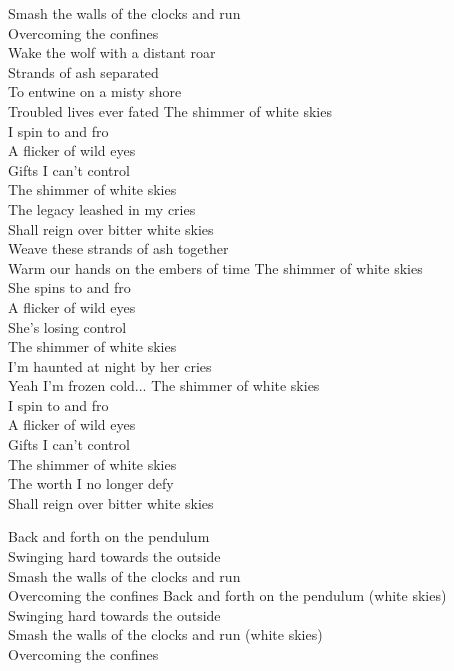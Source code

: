  Smash the walls of the clocks and run\\
 Overcoming the confines\\
 Wake the wolf with a distant roar\\
 Strands of ash separated\\
 To entwine on a misty shore\\
 Troubled lives ever fated
\hop
{} {} The shimmer of white skies\\
 {} I spin to and fro\\
 {} A flicker of wild eyes\\
 {} Gifts I can't control\\
 {} The shimmer of white skies\\
 {} The legacy leashed in my cries\\
 {} Shall reign over bitter white skies\\
\hops
Weave these strands of ash together\\
Warm our hands on the embers of time
\hops
{} {} The shimmer of white skies\\
 {} She spins to and fro\\
 {} A flicker of wild eyes\\
 {} She's losing control\\
 {} The shimmer of white skies\\
 {} I'm haunted at night by her cries\\
 {} Yeah I'm frozen cold...
\hops
{} {} The shimmer of white skies\\
 {} I spin to and fro\\
 {} A flicker of wild eyes\\
 {} Gifts I can't control\\
 {} The shimmer of white skies\\
 {} The worth I no longer defy\\
 {} Shall reign over bitter white skies

 Back and forth on the pendulum\\
 Swinging hard towards the outside\\
 Smash the walls of the clocks and run\\
 Overcoming the confines\hop
{} Back and forth on the pendulum (white skies)\\
 Swinging hard towards the outside\\
 Smash the walls of the clocks and run (white skies)\\
 Overcoming the confines